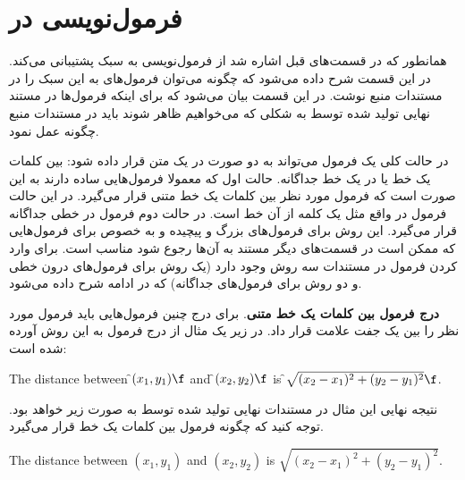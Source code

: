 %
% 
% 
% 
%
\section{فرمول‌نویسی در }
همانطور که در قسمت‌های قبل اشاره شد  از فرمول‌نویسی به سبک
\lr{\LaTeX} پشتیبانی می‌کند. در این قسمت شرح داده می‌شود  که چگونه می‌توان
فرمول‌های به این سبک را در مستندات منبع نوشت. در این قسمت بیان می‌شود که برای
اینکه فرمول‌ها در مستند نهایی تولید شده توسط  به شکلی که می‌خواهیم
ظاهر شوند باید در مستندات منبع چگونه عمل نمود.

در حالت کلی یک فرمول می‌تواند به دو صورت در یک متن قرار داده شود: بین کلمات یک
خط یا در یک خط جداگانه. حالت اول که معمولا فرمول‌هایی ساده دارند به این
صورت است که فرمول مورد نظر بین کلمات یک خط متنی قرار می‌گیرد. در این حالت
فرمول در واقع مثل یک کلمه از آن خط است. در حالت دوم فرمول در خطی
جداگانه قرار می‌گیرد. این روش برای فرمول‌های بزرگ و پیچیده و به خصوص برای
فرمول‌هایی که ممکن است در قسمت‌های دیگر مستند به آن‌ها رجوع شود مناسب است. برای
وارد کردن فرمول در مستندات سه روش وجود دارد (یک روش برای فرمول‌های درون خطی و دو
روش برای فرمول‌های جداگانه) که در ادامه شرح داده می‌شود.

\textbf{درج فرمول بین کلمات یک خط متنی}. برای درج چنین فرمول‌هایی باید
فرمول مورد نظر را بین یک جفت علامت  قرار داد. در زیر یک
مثال از درج فرمول به این روش آورده شده است:
\begin{latex}
The distance between \f$(x_1,y_1)\f$ and \f$(x_2,y_2)\f$ is
\f$\sqrt{(x_2-x_1)^2+(y_2-y_1)^2}\f$.
\end{latex}
نتیجه نهایی این مثال در مستندات نهایی تولید شده توسط  به صورت زیر
خواهد بود. توجه کنید که چگونه فرمول بین کلمات یک خط قرار می‌گیرد.
\begin{latin}
The distance between $(x_1,y_1)$ and $(x_2,y_2)$ is $\sqrt{(x_2-x_1)^2+(y_2-y_1)^2}$.
\end{latin}

